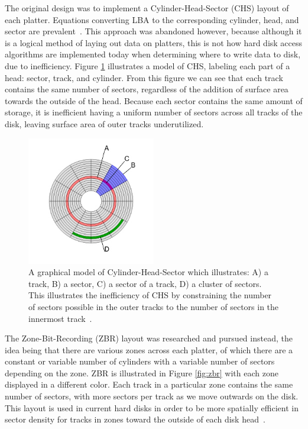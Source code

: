 \documentclass[12pt]{ucthesis}
\begin{document}
The original design was to implement a Cylinder-Head-Sector (CHS) layout of each platter. Equations converting LBA to the corresponding cylinder, head, and sector are prevalent~\cite{chsmapping:1}\cite{chsmapping:2}. This approach was abandoned however, because although it is a logical method of laying out data on platters, this is not how hard disk access algorithms are implemented today when determining where to write data to disk, due to inefficiency. Figure \ref{fig:chs} illustrates a model of CHS, labeling each part of a head: sector, track, and cylinder. From this figure we can see that each track contains the same number of sectors, regardless of the addition of surface area towards the outside of the head. Because each sector contains the same amount of storage, it is inefficient having a uniform number of sectors across all tracks of the disk, leaving surface area of outer tracks underutilized. 

\begin{figure}[h!]
 \centering
 \includegraphics[width=0.5\textwidth]{images/cylinder_head_sector.jpg}
 \caption[A graphical model of a Cylinder-Head-Sector disk layout.]{A graphical model of Cylinder-Head-Sector which illustrates: A) a track, B) a sector, C) a sector of a track, D) a cluster of sectors. This illustrates the inefficiency of CHS by constraining the number of sectors possible in the outer tracks to the number of sectors in the innermost track~\cite{chs:2009}.
}
 \label{fig:chs}
\end{figure}

The Zone-Bit-Recording (ZBR) layout was researched and pursued instead, the idea being that there are various zones across each platter, of which there are a constant or variable number of cylinders with a variable number of sectors depending on the zone. ZBR is illustrated in Figure \ref{fig:zbr} with each zone displayed in a different color. Each track in a particular zone contains the same number of sectors, with more sectors per track as we move outwards on the disk. This layout is used in current hard disks in order to be more spatially efficient in sector density for tracks in zones toward the outside of each disk head~\cite{website:pc_guide}.
\end{document}
